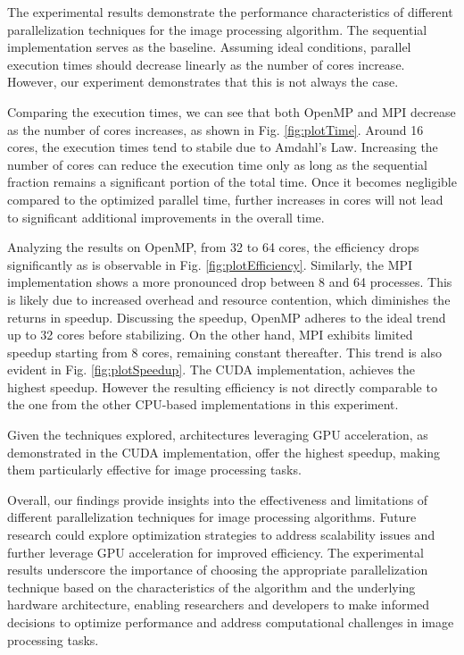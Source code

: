 



The experimental results demonstrate the performance characteristics of different %
parallelization techniques for the image processing algorithm. The sequential %
implementation serves as the baseline. Assuming ideal conditions, parallel execution %
times should decrease linearly as the number of cores increase. However, our experiment %
demonstrates that this is not always the case. 

Comparing the execution times, we can see that both OpenMP %
and MPI decrease as the number of cores increases, as shown in Fig. \ref{fig:plotTime}. %
Around 16 cores, the execution times tend to stabile due to Amdahl's Law. Increasing %
the number of cores can reduce the execution time only as long as the %
sequential fraction remains a significant portion of the total time. %
Once it becomes negligible compared to the optimized %
parallel time, further increases in cores will not lead to significant %
additional improvements in the overall time.

Analyzing the results on OpenMP, from 32 to 64 %
cores, the efficiency drops significantly as is observable in Fig. \ref{fig:plotEfficiency}. %
Similarly, the MPI implementation shows a more pronounced drop between 8 and 64 %
processes. This is likely due to increased overhead and resource contention, which %
diminishes the returns in speedup.
Discussing the speedup, OpenMP adheres to the ideal trend up to 32 cores before %
stabilizing. On the other hand, MPI exhibits limited speedup starting from 8 %
cores, remaining constant thereafter. This trend is also evident in Fig. \ref{fig:plotSpeedup}. %
The CUDA implementation, achieves the highest speedup. However the %
resulting efficiency is not directly comparable to the one from the other %
CPU-based implementations in this experiment.

Given the techniques explored, architectures leveraging GPU acceleration, as %
demonstrated in the CUDA implementation, offer the highest speedup, making them %
particularly effective for image processing tasks.

Overall, our findings provide insights into the effectiveness and limitations of %
different parallelization techniques for image processing algorithms. Future %
research could explore optimization strategies to address scalability issues and %
further leverage GPU acceleration for improved efficiency. The experimental results %
underscore the importance of choosing the appropriate parallelization technique %
based on the characteristics of the algorithm and the underlying hardware %
architecture, enabling researchers and developers to make informed decisions to %
optimize performance and address computational challenges in image processing %
tasks.
